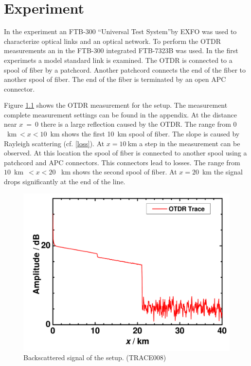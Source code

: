 \chapter{Experiment}
\label{ch:exp}
In the experiment an FTB-300 ``Universal Test System''by EXFO was used to characterize optical links and an optical network. To perform the OTDR measurements an in the FTB-300 integrated FTB-7323B was used. In the first experimets a model standard link is examined. The OTDR is connected to a spool of fiber by a patchcord. Another patchcord connects the end of the fiber to another spool of fiber. The end of the fiber is terminated by an open APC connector. 

Figure \ref{fig:1_line} shows the OTDR measurement for the setup. The measurement complete measurement settings can be found in the appendix.
At the distance near $x$~=~0 there is a large reflection caused by the OTDR. The range from $ 0$~km$~ < x < 10$~km shows the first 10~km spool of fiber. The slope is caused by Rayleigh scattering (cf. {\ref{loss}}). At $x = 10~$km a step in the measurement can be observed. At this location the spool of fiber is connected to another spool using a patchcord and APC connectors. This connectors lead to losses. 
The range from $10$~km~$ < x < 20$
~km shows the second spool of fiber. At $x = 20$~km the signal drops significantly at the end of the line.


\begin{figure}[h]%
\centering
\includegraphics[width=.6\columnwidth]{grafiken/1_line.pdf}%
\caption{Backscattered signal of the setup. (TRACE008)}%
\label{fig:1_line}%
\end{figure}

